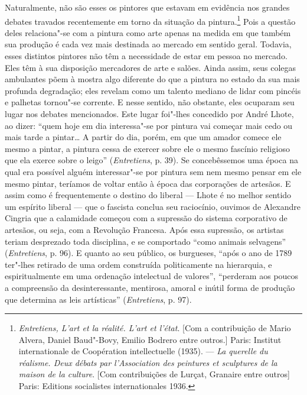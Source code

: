 Naturalmente, não são esses os pintores que estavam em evidência nos
grandes debates travados recentemente em torno da situação da
pintura.\footnote{\emph{Entretiens, L'art et la réalité. L'art et
  l'état}. {[}Com a contribuição de Mario Alvera, Daniel Baud"-Bovy,
  Emilio Bodrero entre outros.{]} Paris: Institut internationale de
  Coopération intellectuelle (1935). --- \emph{La querelle du réalisme.
  Deux débats par l'Association des peintures et sculptures de la maison
  de la culture}. {[}Com contribuições de Lurçat, Granaire entre
  outros{]} Paris: Editions socialistes internationales 1936.} Pois a
questão deles relaciona"-se com a pintura como arte apenas na medida em
que também sua produção é cada vez mais destinada ao mercado em sentido
geral. Todavia, esses distintos pintores não têm a necessidade de estar
em pessoa no mercado. Eles têm à sua disposição mercadores de arte e
salões. Ainda assim, seus colegas ambulantes põem à mostra algo
diferente do que a pintura no estado da sua mais profunda degradação;
eles revelam como um talento mediano de lidar com pincéis e palhetas
tornou"-se corrente. E nesse sentido, não obstante, eles ocuparam seu
lugar nos debates mencionados. Este lugar foi"-lhes concedido por André
Lhote, ao dizer: ``quem hoje em dia interessa"-se por pintura vai começar
mais cedo ou mais tarde a pintar\ldots{} A partir do dia, porém, em que um
amador comece ele mesmo a pintar, a pintura cessa de exercer sobre ele o
mesmo fascínio religioso que ela exerce sobre o leigo''
(\emph{Entretiens}, p. 39). Se concebêssemos uma época na qual era
possível alguém interessar"-se por pintura sem nem mesmo pensar em ele
mesmo pintar, teríamos de voltar então à época das corporações de
artesãos. E assim como é frequentemente o destino do liberal --- Lhote é
no melhor sentido um espírito liberal --- que o fascista conclua seu
raciocínio, ouvimos de Alexandre Cingria que a calamidade começou com a
supressão do sistema corporativo de artesãos, ou seja, com a Revolução
Francesa. Após essa supressão, os artistas teriam desprezado toda
disciplina, e se comportado ``como animais selvagens''
(\emph{Entretiens}, p. 96). E quanto ao seu público, os burgueses,
``após o ano de 1789 ter"-lhes retirado de uma ordem construída
politicamente na hierarquia, e espiritualmente em uma ordenação
intelectual de valores'', ``perderam aos poucos a compreensão da
desinteressante, mentirosa, amoral e inútil forma de produção que
determina as leis artísticas'' (\emph{Entretiens}, p. 97).

